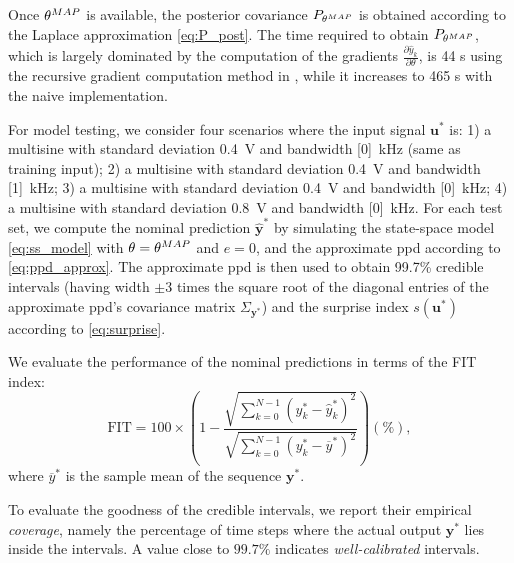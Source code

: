 \documentclass{ifacconf}
\newcommand{\nsamp}{N}
\newcommand{\MAP}{{\rm MAP}}
\newcommand{\tvec}[1]{{\mathbf{#1}}}
\newcommand{\mean}[1]{\hat{#1}}
\begin{document}
Once $\theta^\MAP$ is available, the posterior covariance $P_{\theta^\MAP}$ is obtained according to the Laplace approximation \eqref{eq:P_post}. The time required to obtain $P_{\theta^\MAP}$, which is largely dominated by the computation of the gradients $\frac{\partial \mean{y}_k}{\partial \theta}$, is  44 s using the recursive gradient computation method in \cite{forgione2022adaptation}, while it increases to 465 s with the naive implementation.

For model testing, we consider four  scenarios where the input signal $\tvec{u}^*$ is:
 1) a multisine with standard deviation 0.4~V and bandwidth [0]~kHz (same as training input);
 2) a multisine with standard deviation 0.4~V and bandwidth [1]~kHz;
 3) a multisine with standard deviation 0.4~V and bandwidth [0]~kHz;
 4) a multisine with standard deviation 0.8~V and bandwidth [0]~kHz.
 For each test set, we compute the nominal prediction $\mean{\tvec{y}}^*$ by simulating the state-space model \eqref{eq:ss_model} with $\theta=\theta^\MAP$ and  $e=0$, and the approximate ppd according to \eqref{eq:ppd_approx}. The approximate ppd is then used to obtain 99.7\% credible intervals (having width $\pm 3$ times the square root of the diagonal entries of the approximate ppd's covariance matrix $\Sigma_{\tvec{y}^*}$) and the surprise index $s(\tvec{u}^*)$ according to \eqref{eq:surprise}.

 
We evaluate the performance of the nominal predictions in terms of the FIT index:
\begin{equation}
\label{eq:fit_index}
\mathrm{FIT} = 100 \times \left(1- \frac{\sqrt{\sum_{k=0}^{\nsamp-1} \left({y}^*_k -  \mean{y}^*_k\right)^2} }  
{\sqrt{\sum_{k=0}^{\nsamp-1} \left({y}^*_k -  {\overline{y}^*}\right)^2}}\right) (\%),
\end{equation}
where ${\overline{y}^*}$ is the sample mean of the sequence $\tvec{y}^*$. %

To evaluate the goodness of the credible intervals, we report their empirical \emph{coverage}, namely the percentage 
of time steps where the actual output $\tvec{y}^*$ lies inside the intervals. A value close to $99.7\%$ indicates \emph{well-calibrated} intervals.
\end{document}
